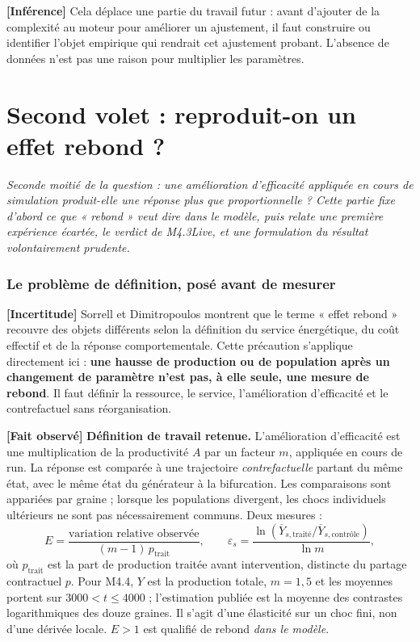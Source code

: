 \documentclass[11pt,a4paper]{article}
\newcommand{\fait}{\textbf{[Fait observé]}}
\newcommand{\inference}{\textbf{[Inférence]}}
\newcommand{\incertitude}{\textbf{[Incertitude]}}
\begin{document}
\inference{} Cela déplace une partie du travail futur : avant d'ajouter de la
complexité au moteur pour améliorer un ajustement, il faut construire ou
identifier l'objet empirique qui rendrait cet ajustement probant. L'absence de
données n'est pas une raison pour multiplier les paramètres.

\clearpage
\part{Second volet : reproduit-on un effet rebond ?}
\label{part:rebond}

\emph{Seconde moitié de la question : une amélioration d'efficacité appliquée en cours
de simulation produit-elle une réponse plus que proportionnelle ? Cette partie fixe
d'abord ce que « rebond » veut dire dans le modèle, puis relate une première
expérience écartée, le verdict de M4.3Live, et une formulation du résultat
volontairement prudente.}

\section{Le problème de définition, posé avant de mesurer}

\incertitude{} Sorrell et Dimitropoulos montrent que le terme « effet rebond »
recouvre des objets différents selon la définition du service énergétique, du
coût effectif et de la réponse comportementale. Cette précaution s'applique
directement ici : \textbf{une hausse de production ou de population après un
changement de paramètre n'est pas, à elle seule, une mesure de rebond}. Il faut
définir la ressource, le service, l'amélioration d'efficacité et le
contrefactuel sans réorganisation.

\fait{} \textbf{Définition de travail retenue.} L'amélioration d'efficacité est
une multiplication de la productivité $A$ par un facteur $m$, appliquée en
cours de run. La réponse est comparée à une trajectoire \emph{contrefactuelle}
partant du même état, avec le même état du générateur à la bifurcation.
Les comparaisons sont appariées par graine ; lorsque les populations divergent,
les chocs individuels ultérieurs ne sont pas nécessairement communs. Deux mesures :
\[
E = \frac{\text{variation relative observée}}{(m-1)\,p_{\mathrm{trait}}}, \qquad
\widehat\varepsilon_s =
\frac{\ln(\overline{Y}_{s,\text{traité}}/\overline{Y}_{s,\text{contrôle}})}{\ln m},
\]
où $p_{\mathrm{trait}}$ est la part de production traitée avant intervention,
distincte du partage contractuel $p$. Pour M4.4, $Y$ est la production totale,
$m=1{,}5$ et les moyennes portent sur $3000<t\le4000$ ; l'estimation publiée
est la moyenne des contrastes logarithmiques des douze graines.
Il s'agit d'une élasticité sur un choc fini, non d'une dérivée locale. $E > 1$ est
qualifié de rebond \emph{dans le modèle}.
\end{document}
